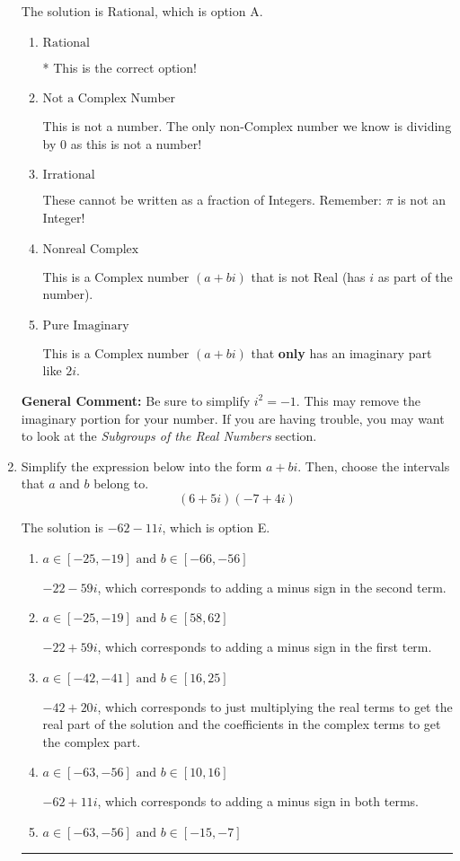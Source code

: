 \documentclass{extbook}[14pt]
\newcommand{\litem}[1]{\item #1

\rule{\textwidth}{0.4pt}}
\begin{document}
\begin{enumerate}
{The solution is \( \text{Rational} \), which is option A.\begin{enumerate}[label=\Alph*.]
\item \( \text{Rational} \)

* This is the correct option!
\item \( \text{Not a Complex Number} \)

This is not a number. The only non-Complex number we know is dividing by 0 as this is not a number!
\item \( \text{Irrational} \)

These cannot be written as a fraction of Integers. Remember: $\pi$ is not an Integer!
\item \( \text{Nonreal Complex} \)

This is a Complex number $(a+bi)$ that is not Real (has $i$ as part of the number).
\item \( \text{Pure Imaginary} \)

This is a Complex number $(a+bi)$ that \textbf{only} has an imaginary part like $2i$.
\end{enumerate}

\textbf{General Comment:} Be sure to simplify $i^2 = -1$. This may remove the imaginary portion for your number. If you are having trouble, you may want to look at the \textit{Subgroups of the Real Numbers} section.
}
\litem{
Simplify the expression below into the form $a+bi$. Then, choose the intervals that $a$ and $b$ belong to.
\[ (6 + 5 i)(-7 + 4 i) \]

The solution is \( -62 - 11 i \), which is option E.\begin{enumerate}[label=\Alph*.]
\item \( a \in [-25, -19] \text{ and } b \in [-66, -56] \)

 $-22 - 59 i$, which corresponds to adding a minus sign in the second term.
\item \( a \in [-25, -19] \text{ and } b \in [58, 62] \)

 $-22 + 59 i$, which corresponds to adding a minus sign in the first term.
\item \( a \in [-42, -41] \text{ and } b \in [16, 25] \)

 $-42 + 20 i$, which corresponds to just multiplying the real terms to get the real part of the solution and the coefficients in the complex terms to get the complex part.
\item \( a \in [-63, -56] \text{ and } b \in [10, 16] \)

 $-62 + 11 i$, which corresponds to adding a minus sign in both terms.
\item \( a \in [-63, -56] \text{ and } b \in [-15, -7] \)


\end{enumerate}}
\end{enumerate}
\end{document}
